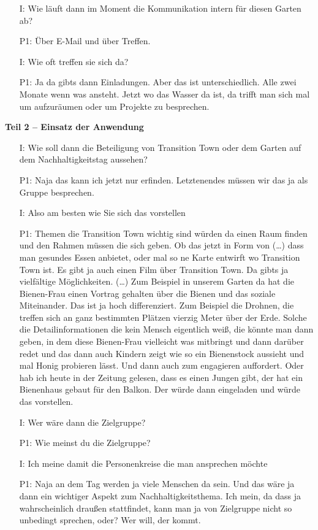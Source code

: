 \begin{itemize}
	\item[I:] Wie l{\"a}uft dann im Moment die Kommunikation intern f{\"u}r diesen Garten ab?
	\item[P1:] Über E-Mail und {\"u}ber Treffen.
	\item[I:] Wie oft treffen sie sich da?
	\item[P1:] Ja da gibts dann Einladungen. Aber das ist unterschiedlich. Alle zwei Monate wenn was ansteht. Jetzt wo das Wasser da ist, da trifft man sich mal um aufzur{\"a}umen oder um Projekte zu besprechen.	
\end{itemize}

\textbf{Teil 2 -- Einsatz der Anwendung}
\begin{itemize}
	\item[I:] Wie soll dann die Beteiligung von Transition Town oder dem Garten auf dem Nachhaltigkeitstag aussehen?
	\item[P1:] Naja das kann ich jetzt nur erfinden. Letztenendes m{\"u}ssen wir das ja als Gruppe besprechen.
	\item[I:] Also am besten wie Sie sich das vorstellen
	\item[P1:] Themen die Transition Town wichtig sind w{\"u}rden da einen Raum finden und den Rahmen m{\"u}ssen die sich geben. Ob das jetzt in Form von (\dots) dass man gesundes Essen anbietet, oder mal so ne Karte entwirft wo Transition Town ist. Es gibt ja auch einen Film {\"u}ber Transition Town. Da gibts ja vielf{\"a}ltige M{\"o}glichkeiten. (\dots) Zum Beispiel in unserem Garten da hat die Bienen-Frau einen Vortrag gehalten {\"u}ber die Bienen und das soziale Miteinander. Das ist ja hoch differenziert. Zum Beispiel die Drohnen, die treffen sich an ganz bestimmten Pl{\"a}tzen vierzig Meter {\"u}ber der Erde. Solche die Detailinformationen die kein Mensch eigentlich wei{\ss}, die k{\"o}nnte man dann geben, in dem diese Bienen-Frau vielleicht was mitbringt und dann dar{\"u}ber redet und das dann auch Kindern zeigt wie so ein Bienenstock aussieht und mal Honig probieren l{\"a}sst. Und dann auch zum engagieren auffordert. Oder hab ich heute in der Zeitung gelesen, dass es einen Jungen gibt, der hat ein Bienenhaus gebaut f{\"u}r den Balkon. Der w{\"u}rde dann eingeladen und w{\"u}rde das vorstellen.
	\item[I:] Wer w{\"a}re dann die Zielgruppe? 
	\item[P1:] Wie meinst du die Zielgruppe?
	\item[I:] Ich meine damit die Personenkreise die man ansprechen m{\"o}chte
	\item[P1:] Naja an dem Tag werden ja viele Menschen da sein. Und das w{\"a}re ja dann ein wichtiger Aspekt zum Nachhaltigkeitsthema. Ich mein, da dass ja wahrscheinlich drau{\ss}en stattfindet, kann man ja von Zielgruppe nicht so unbedingt sprechen, oder? Wer will, der kommt.

\end{itemize}
